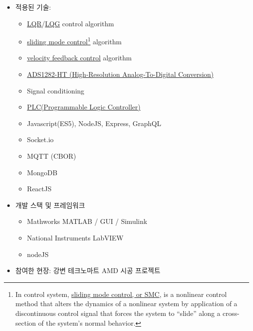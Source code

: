 \begin{itemize}[label=]
\begin{itemize}[label=]
\begin{figure}[!ht]
		            \end{figure}
		      \item
		            적용된 기술:
		            \begin{itemize}
			            \item \href{https://en.wikipedia.org/wiki/Linear-quadratic_regulator}{LQR}/\href{https://en.wikipedia.org/wiki/Linear-quadratic-Gaussian_control}{LQG} control algorithm
			            \item \href{https://en.wikipedia.org/wiki/Sliding_mode_control}{sliding mode control}\footnote{In control system,  \href{https://en.wikipedia.org/wiki/Sliding_mode_control}{sliding mode control, or SMC}, is a nonlinear control method that alters the dynamics of a nonlinear system by application of a discontinuous control signal that forces the system to ``slide'' along a cross-section of the system's normal behavior.} algorithm
			            \item \href{https://en.wikipedia.org/wiki/Minor_loop_feedback}{velocity feedback control} algorithm
			            \item \href{http://www.ti.com/lit/ds/symlink/ads1282-ht.pdf}{ADS1282-HT (High-Resolution Analog-To-Digital Conversion)}
			            \item Signal conditioning
			            \item \href{https://en.wikipedia.org/wiki/Programmable_logic_controller}{PLC(Programmable Logic Controller)}
			            \item Javascript(ES5), NodeJS, Express, GraphQL
			            \item Socket.io
			            \item MQTT (CBOR)
			            \item MongoDB
			            \item ReactJS
		            \end{itemize}
		      \item 개발 스택 및 프레임워크
		            \begin{itemize}
			            \item Mathworks MATLAB / GUI / Simulink
			            \item National Instruments LabVIEW
			            \item nodeJS
		            \end{itemize}
		      \item 참여한 현장: 강변 테크노마트 AMD 시공 프로젝트

	      \end{itemize}
\end{itemize}


